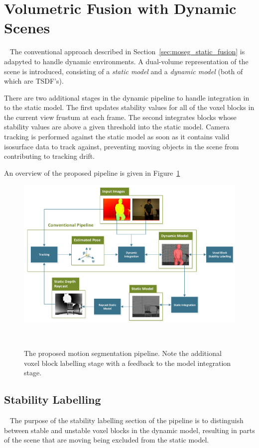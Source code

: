 \section{Volumetric Fusion with Dynamic Scenes}
~\label{sec:moseg_dynamic_fusion}
The conventional approach described in Section~\ref{sec:moseg_static_fusion} is adapyted to handle dynamic 
environments. A dual-volume representation of the scene is introduced, consisting of a \emph{static model}
and a \emph{dynamic model} (both of which are TSDF's).

There are two additional stages in the dynamic pipeline to handle integration in
to the static model. The first updates stability values for all of the voxel
blocks in the current view frustum at each frame. The second integrates blocks
whose stability values are above a given threshold into the static model.
Camera tracking is performed against the static model as soon as it contains
valid isosurface data to track against, preventing moving objects in the scene
from contributing to tracking drift.

An overview of the proposed pipeline is given in Figure~\ref{figure:moseg_pipeline}
\begin{figure}[!htbp]
  \centering
  \includegraphics[width=0.95\linewidth]{figures/moseg/pipeline.pdf}
  \caption[Motion Segmentation Pipeline]{The proposed motion segmentation pipeline. 
  Note the additional voxel block labelling stage with a feedback to the model 
  integration stage.}
~\label{figure:moseg_pipeline}
\end{figure}

\subsection{Stability Labelling}
~\label{sub:moseg_stability_labelling}
The purpose of the stability labelling section of the pipeline is to distinguish
between stable and unstable voxel blocks in the dynamic model, resulting in
parts of the scene that are moving being excluded from the static model.

